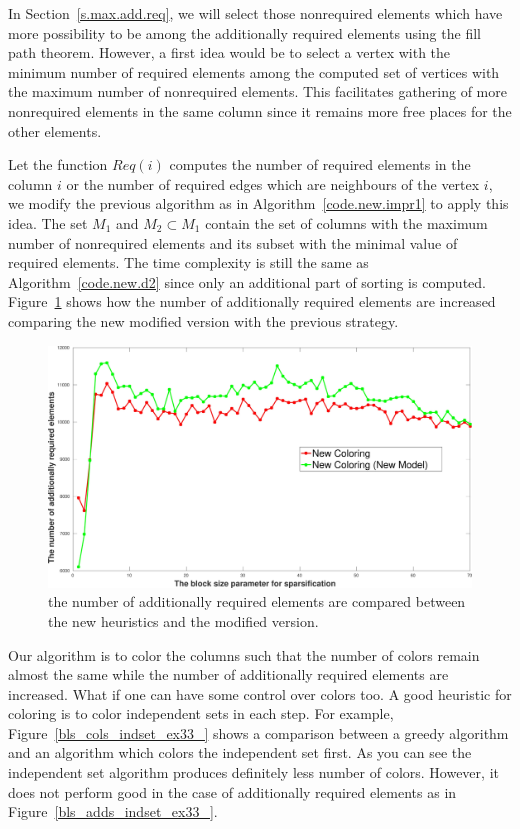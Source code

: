 \documentclass[11pt, twoside,a4paper]{book}
\newcommand{\figref}[1]{Figure~\protect\ref{#1}}
\newcommand{\secref}[1]{Section~\protect\ref{#1}}
\newcommand{\coderef}[1]{Algorithm~\protect\ref{#1}}
\begin{document}
In \secref{s.max.add.req}, we will select those nonrequired elements which have more possibility
to be among the additionally required elements using the fill path theorem.
However, a first idea would be to select a vertex with the minimum number of required elements
among the computed set of vertices with the maximum number of nonrequired elements.
This facilitates gathering of more nonrequired elements in the same column since
it remains more free places for the other elements.

Let the function $Req(i)$ computes the number of required elements in the column $i$ or the
number of required edges which are neighbours of the vertex $i$,
we modify the previous algorithm as in \coderef{code.new.impr1} to
apply this idea. The set $M_1$ and $M_2\subset M_1$ contain the set of columns with the maximum
number of nonrequired elements and its subset with the minimal value of required elements.
The time complexity is still the same as \coderef{code.new.d2}
since only an additional part of sorting is computed.
\figref{bls_add_ex33_compare_max} shows how the number of additionally
required elements are increased comparing the new modified version with the previous strategy.
\begin{figure}
\centering
\includegraphics[width=0.9\linewidth]{bls_add_ex33_compare_max}
\caption{the number of additionally required elements are compared between the new heuristics
and the modified version.}
\label{bls_add_ex33_compare_max}
\end{figure}

Our algorithm is to color the columns such that the number of colors
remain almost the same while the number of additionally required elements are increased.
What if one can have some control over colors too.
A good heuristic for coloring is to color independent sets in each step.
For example, \figref{bls_cols_indset_ex33_} shows a comparison between a greedy algorithm and
an algorithm which colors the independent set first. As you can see the independent set algorithm
produces definitely less number of colors. However, it does not perform good in the case of additionally
required elements as in \figref{bls_adds_indset_ex33_}.
\end{document}
